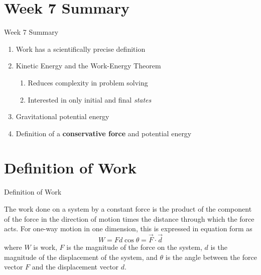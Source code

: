 \documentclass{beamer}
\begin{document}
\section{Week 7 Summary}

\begin{frame}{Week 7 Summary}
\begin{enumerate}
\item \alert{Work} has a scientifically precise definition
\item Kinetic Energy and the \alert{Work-Energy Theorem}
\begin{enumerate}
\item Reduces complexity in problem solving
\item Interested in only initial and final \textit{states}
\end{enumerate}
\item Gravitational potential energy
\item Definition of a \textbf{conservative force} and potential energy
\end{enumerate}
\end{frame}

\section{Definition of Work}

\begin{frame}{Definition of Work}
\begin{tcolorbox}[colback=white,colframe=red!40!blue,title=Definition of Work]
\small
\alert{
The work done on a system by a constant force is the product of the component of the force in the direction of motion times the distance through which the force acts.  For one-way motion in one dimension, this is expressed in equation form as 
\begin{equation}
W = Fd\cos\theta = \vec{F} \cdot \vec{d}
\end{equation}
where $W$ is work, $F$ is the magnitude of the force on the system, $d$ is the magnitude of the displacement of the system, and $\theta$ is the angle between the force vector $F$ and the displacement vector $d$.
}
\end{tcolorbox}
\end{frame}
\end{document}
